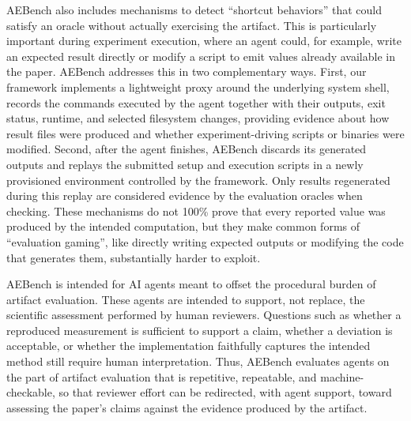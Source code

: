AEBench also includes mechanisms to detect ``shortcut behaviors'' that could satisfy an oracle without actually exercising the artifact. This is particularly important during experiment execution, where an agent could, for example, write an expected result directly or modify a script to emit values already available in the paper. AEBench addresses this in two complementary ways. First, our framework implements a lightweight proxy around the underlying system shell, records the commands executed by the agent together with their outputs, exit status, runtime, and selected filesystem changes, providing evidence about how result files were produced and whether experiment-driving scripts or binaries were modified. Second, after the agent finishes, AEBench discards its generated outputs and replays the submitted setup and execution scripts in a newly provisioned environment controlled by the framework. Only results regenerated during this replay are considered evidence by the evaluation oracles when checking. These mechanisms do not 100\% prove that every reported value was produced by the intended computation, but they make common forms of ``evaluation gaming'', like directly writing expected outputs or modifying the code that generates them, substantially harder to exploit.

AEBench is intended for AI agents meant to offset the procedural burden of artifact evaluation. These agents are intended to support, not replace, the scientific assessment performed by human reviewers. Questions such as whether a reproduced measurement is sufficient to support a claim, whether a deviation is acceptable, or whether the implementation faithfully captures the intended method still require human interpretation. Thus, AEBench evaluates agents on the part of artifact evaluation that is repetitive, repeatable, and machine-checkable, so that reviewer effort can be redirected, with agent support, toward assessing the paper's claims against the evidence produced by the artifact.
